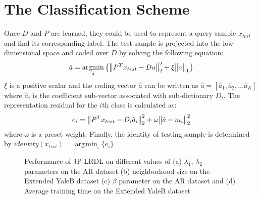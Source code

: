 \documentclass[journal]{IEEEtran}
\DeclareMathOperator*{\argmin}{\arg\!\min}
\DeclarePairedDelimiter\norm{\lVert}{\rVert}
\begin{document}
\section{The Classification Scheme}
\label{sec:classification}
Once $D$ and $P$ are learned, they could be used to represent a query sample $x_{test}$ and find its corresponding label. The test sample is projected into the low-dimensional space and coded over $D$ by solving the following equation:
\begin{gather}
\hat{a} = \argmin_{a} \big\{ \norm[\big]{P^T x_{test} - D a}_{2}^2 + \xi \norm[\big]{a}_{1} \big\}
\label{eq24}
\end{gather}
$\xi$ is a positive scalar and the coding vector $\hat{a}$ can be written as $\hat{a} = [\hat{a}_1, \hat{a}_2, \dots \hat{a}_K]$ where $\hat{a}_i$ is the coefficient sub-vector associated with sub-dictionary $D_i$. The representation residual for the $i$th class is calculated as:
\begin{gather}
e_i = \norm[\big]{P^T x_{test} - D_i \hat{a}_i}_{2}^2 + \omega \norm[\big]{\hat{a} - m_i}_{2}^2 
\label{eq25}
\end{gather}
where $\omega$ is a preset weight. Finally, the identity of testing sample is determined by $identity(x_{test}) = \argmin_{i} \{e_i\}$.
\begin{figure}[b]
\centering
{}  
\hspace{2pt} 
\vspace{0.2em} 
\hspace{2pt} 
\caption{Performance of JP-LRDL on different values of (a) $\lambda_1$, $\lambda_2$ parameters on the AR dataset (b) neighborhood size on the Extended YaleB dataset (c) $\beta$ parameter on the AR dataset and (d) Average training time on the Extended YaleB dataset}
\vspace{-1.5em}
\end{figure} 
\end{document}
